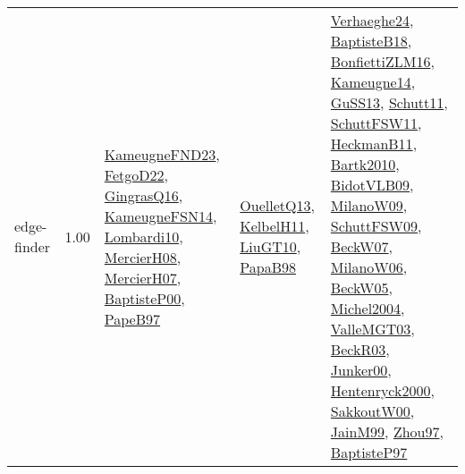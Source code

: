 {\begin{longtable}{p{3cm}r>{\raggedright\arraybackslash}p{6cm}>{\raggedright\arraybackslash}p{6cm}>{\raggedright\arraybackslash}p{8cm}}
\index{edge-finder}\index{Algorithms!edge-finder}edge-finder &  1.00 & \hyperref[detail:KameugneFND23]{KameugneFND23}, \hyperref[detail:FetgoD22]{FetgoD22}, \hyperref[detail:GingrasQ16]{GingrasQ16}, \hyperref[detail:KameugneFSN14]{KameugneFSN14}, \hyperref[detail:Lombardi10]{Lombardi10}, \hyperref[detail:MercierH08]{MercierH08}, \hyperref[detail:MercierH07]{MercierH07}, \hyperref[detail:BaptisteP00]{BaptisteP00}, \hyperref[detail:PapeB97]{PapeB97} & \hyperref[detail:OuelletQ13]{OuelletQ13}, \hyperref[detail:KelbelH11]{KelbelH11}, \hyperref[detail:LiuGT10]{LiuGT10}, \hyperref[detail:PapaB98]{PapaB98} & \hyperref[detail:Verhaeghe24]{Verhaeghe24}, \hyperref[detail:BaptisteB18]{BaptisteB18}, \hyperref[detail:BonfiettiZLM16]{BonfiettiZLM16}, \hyperref[detail:Kameugne14]{Kameugne14}, \hyperref[detail:GuSS13]{GuSS13}, \hyperref[detail:Schutt11]{Schutt11}, \hyperref[detail:SchuttFSW11]{SchuttFSW11}, \hyperref[detail:HeckmanB11]{HeckmanB11}, \hyperref[detail:Bartk2010]{Bartk2010}, \hyperref[detail:BidotVLB09]{BidotVLB09}, \hyperref[detail:MilanoW09]{MilanoW09}, \hyperref[detail:SchuttFSW09]{SchuttFSW09}, \hyperref[detail:BeckW07]{BeckW07}, \hyperref[detail:MilanoW06]{MilanoW06}, \hyperref[detail:BeckW05]{BeckW05}, \hyperref[detail:Michel2004]{Michel2004}, \hyperref[detail:ValleMGT03]{ValleMGT03}, \hyperref[detail:BeckR03]{BeckR03}, \hyperref[detail:Junker00]{Junker00}, \hyperref[detail:Hentenryck2000]{Hentenryck2000}, \hyperref[detail:SakkoutW00]{SakkoutW00}, \hyperref[detail:JainM99]{JainM99}, \hyperref[detail:Zhou97]{Zhou97}, \hyperref[detail:BaptisteP97]{BaptisteP97}\\

\end{longtable}}
